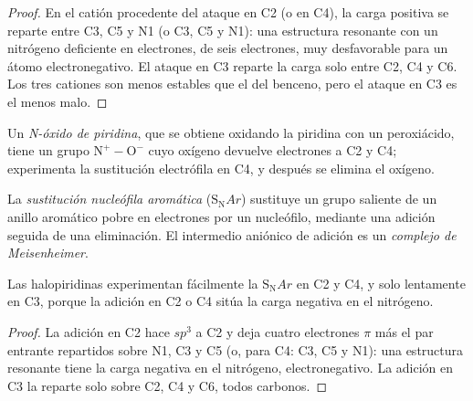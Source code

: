 \begin{proof}
En el catión procedente del ataque en C2 (o en C4), la carga positiva se reparte entre C3, C5
y N1 (o C3, C5 y N1): una estructura resonante con un nitrógeno deficiente en electrones,
de seis electrones, muy desfavorable para un átomo electronegativo. El ataque
en C3 reparte la carga solo entre C2, C4 y C6. Los tres cationes son menos estables
que el del benceno, pero el ataque en C3 es el menos malo.
\end{proof}

\begin{definition}\label{def:b3:heterocycles:n-oxide}
Un \emph{N-óxido de piridina}, que se obtiene oxidando la piridina
con un peroxiácido, tiene un grupo $\mathrm{N^+{-}O^-}$ cuyo oxígeno devuelve electrones a C2
y C4; experimenta la sustitución electrófila en C4, y después se elimina el
oxígeno.
\end{definition}

\begin{definition}\label{def:b3:heterocycles:snar}
La \emph{sustitución nucleófila aromática}
($\mathrm S_\mathrm NAr$) sustituye un grupo saliente de un anillo aromático pobre en electrones
por un nucleófilo, mediante una adición seguida de una eliminación. El intermedio
aniónico de adición es un \emph{complejo de Meisenheimer}.
\end{definition}

\begin{proposition}\label{prop:b3:heterocycles:snar-positions}
Las halopiridinas experimentan fácilmente la $\mathrm S_\mathrm NAr$ en C2 y C4, y solo lentamente en C3,
porque la adición en C2 o C4 sitúa la carga negativa en el nitrógeno.
\end{proposition}

\begin{proof}
La adición en C2 hace $sp^3$ a C2 y deja cuatro electrones $\pi$ más el par entrante
repartidos sobre N1, C3 y C5 (o, para C4: C3, C5 y N1): una estructura resonante tiene la
carga negativa en el nitrógeno, electronegativo. La adición en C3 la reparte solo sobre
C2, C4 y C6, todos carbonos.
\end{proof}

